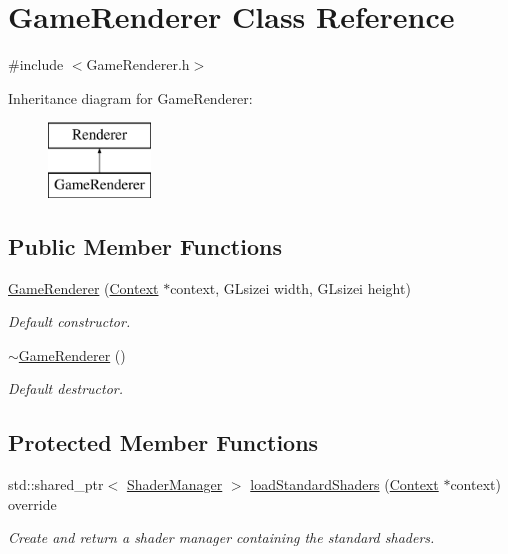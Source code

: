 \hypertarget{class_game_renderer}{}\section{Game\+Renderer Class Reference}
\label{class_game_renderer}


{\ttfamily \#include $<$Game\+Renderer.\+h$>$}

Inheritance diagram for Game\+Renderer\+:\begin{figure}[H]
\begin{center}
\leavevmode
\includegraphics[height=2.000000cm]{class_game_renderer}
\end{center}
\end{figure}
\subsection*{Public Member Functions}
\begin{DoxyCompactItemize}
\item 
\hyperlink{class_game_renderer_a91d4feda47647fc97397d9e09bbc36df}{Game\+Renderer} (\hyperlink{class_context}{Context} $\ast$context, G\+Lsizei width, G\+Lsizei height)
\begin{DoxyCompactList}\small\item\em Default constructor. \end{DoxyCompactList}\item 
\hyperlink{class_game_renderer_a7548becdb4364d14cafa7a5436f42af6}{$\sim$\+Game\+Renderer} ()
\begin{DoxyCompactList}\small\item\em Default destructor. \end{DoxyCompactList}\end{DoxyCompactItemize}
\subsection*{Protected Member Functions}
\begin{DoxyCompactItemize}
\item 
std\+::shared\+\_\+ptr$<$ \hyperlink{class_shader_manager}{Shader\+Manager} $>$ \hyperlink{class_game_renderer_ac01f6745a9dd800dfe4c5fb12d46bc38}{load\+Standard\+Shaders} (\hyperlink{class_context}{Context} $\ast$context) override
\begin{DoxyCompactList}\small\item\em Create and return a shader manager containing the standard shaders. \end{DoxyCompactList}\end{DoxyCompactItemize}


